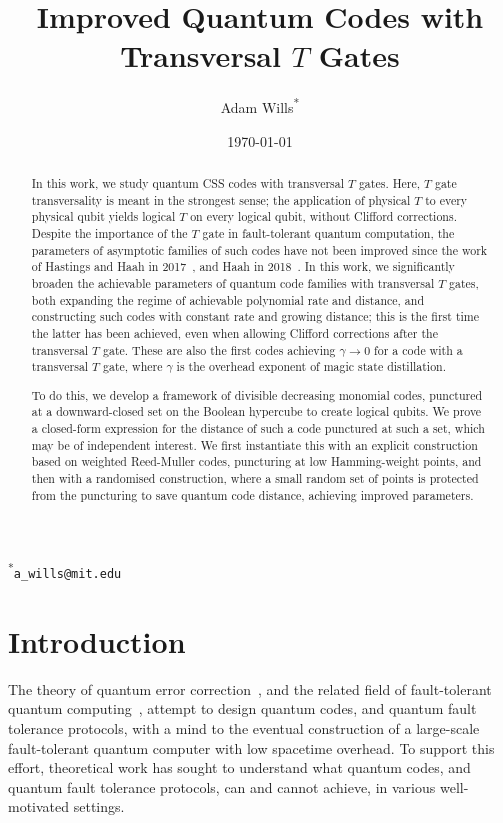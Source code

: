 \documentclass{article}
\title{Improved Quantum Codes with Transversal $T$ Gates}
\date{\today}
\author[1,2]{Adam Wills\textsuperscript{*}}
\affil[1]{Center for Theoretical Physics — a Leinweber Institute, \protect\\ Massachusetts Institute of Technology, Cambridge, MA\vspace*{5mm}}
\affil[2]{IBM Research, IBM T. J. Watson Research Center, NY}
\begin{document}
\maketitle


\begin{abstract}
    In this work, we study quantum CSS codes with transversal $T$ gates. Here, $T$ gate transversality is meant in the strongest sense; the application of physical $T$ to every physical qubit yields logical $T$ on every logical qubit, without Clifford corrections. Despite the importance of the $T$ gate in fault-tolerant quantum computation, the parameters of asymptotic families of such codes have not been improved since the work of Hastings and Haah in 2017~\cite{sublogarithmic_arxiv}, and Haah in 2018~\cite{haah2018towers}. In this work, we significantly broaden the achievable parameters of quantum code families with transversal $T$ gates, both expanding the regime of achievable polynomial rate and distance, and constructing such codes with constant rate and growing distance; this is the first time the latter has been achieved, even when allowing Clifford corrections after the transversal $T$ gate. These are also the first codes achieving $\gamma \to 0$ for a code with a transversal $T$ gate, where $\gamma$ is the overhead exponent of magic state distillation.

    To do this, we develop a framework of divisible decreasing monomial codes, punctured at a downward-closed set on the Boolean hypercube to create logical qubits. We prove a closed-form expression for the distance of such a code punctured at such a set, which may be of independent interest. We first instantiate this with an explicit construction based on weighted Reed-Muller codes, puncturing at low Hamming-weight points, and then with a randomised construction, where a small random set of points is protected from the puncturing to save quantum code distance, achieving improved parameters.
\end{abstract}
\vfill
\footnoterule
\noindent\textsuperscript{*}\texttt{a\_wills@mit.edu}
\pagebreak
\tableofcontents


\section{Introduction}

The theory of quantum error correction~\cite{shor1995scheme}, and the related field of fault-tolerant quantum computing~\cite{aharonov1997fault}, attempt to design quantum codes, and quantum fault tolerance protocols, with a mind to the eventual construction of a large-scale fault-tolerant quantum computer with low spacetime overhead. To support this effort, theoretical work has sought to understand what quantum codes, and quantum fault tolerance protocols, can and cannot achieve, in various well-motivated settings.
\end{document}
